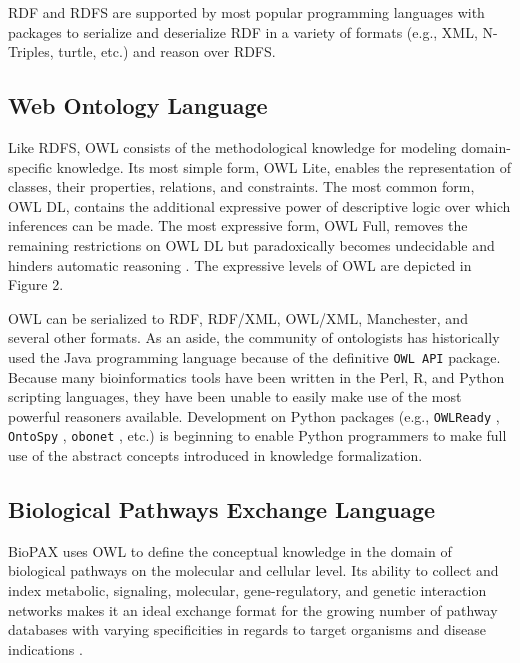 RDF and RDFS are supported by most popular programming languages with packages to serialize and deserialize \ac{RDF} in a variety of formats (e.g., \ac{XML}, N-Triples, turtle, etc.) and reason over \ac{RDFS}.
    
\subsection{Web Ontology Language}

Like \ac{RDFS}, \ac{OWL} consists of the methodological knowledge for modeling domain-specific knowledge. Its most simple form, \ac{OWL} Lite, enables the representation of classes, their properties, relations, and constraints. The most common form, \ac{OWL} \ac{DL}, contains the additional expressive power of descriptive logic over which inferences can be made. The most expressive form, \ac{OWL} Full, removes the remaining restrictions on \ac{OWL} \ac{DL} but paradoxically becomes undecidable and hinders automatic reasoning \cite{Marchetti2008}. The expressive levels of \ac{OWL} are depicted in Figure 2.


\ac{OWL} can be serialized to \ac{RDF}, RDF/XML, OWL/XML, Manchester, and several other formats. As an aside, the community of ontologists has historically used the Java programming language because of the definitive \verb|OWL API| \cite{owlapi} package. Because many bioinformatics tools have been written in the Perl, R, and Python scripting languages, they have been unable to easily make use of the most powerful reasoners available. Development on Python packages (e.g., \verb|OWLReady| \cite{owlready}, \verb|OntoSpy| \cite{ontospy}, \verb|obonet| \cite{obonet}, etc.) is beginning to enable Python programmers to make full use of the abstract concepts introduced in knowledge formalization.

\subsection{Biological Pathways Exchange Language}

\ac{BioPAX} uses \ac{OWL} to define the conceptual knowledge in the domain of biological pathways on the molecular and cellular level. Its ability to collect and index metabolic, signaling, molecular, gene-regulatory, and genetic interaction networks makes it an ideal exchange format for the growing number of pathway databases with varying specificities in regards to target organisms and disease indications \cite{Demir2010}.

